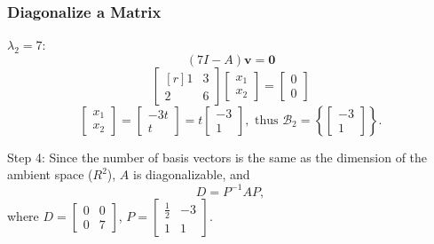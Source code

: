 \documentclass[10pt]{beamer}
\begin{document}
\begin{frame}
\frametitle{Diagonalize a Matrix}

$\lambda_2 = 7$:\pause
\[
 (7 I - A)\mathbf v = \mathbf 0
\]
\pause
\[
\begin{bmatrix*}[r]
1&3\\
2&6
\end{bmatrix*}\begin{bmatrix}
x_1\\
x_2
\end{bmatrix} = \begin{bmatrix}
0\\0	
\end{bmatrix}
\]\pause
\[
\begin{bmatrix}
x_1\\
x_2	
\end{bmatrix} = \begin{bmatrix}
-3t\\
t
\end{bmatrix} = t \begin{bmatrix}
-3\\
1
\end{bmatrix}, \text{ thus } \mathscr B_2 = \left\{ \begin{bmatrix}
-3\\
1
\end{bmatrix}\right\}.
\]\pause

Step 4: Since the number of basis vectors is the same as the dimension of the ambient space ($R^2$), $A$ is diagonalizable, and 
\[
D = P^{-1}AP, 
\] where $D = \begin{bmatrix}
0&0\\
0&7	
\end{bmatrix}$, $P = \begin{bmatrix}
\frac{1}{2}&-3\\
1&1
\end{bmatrix}$.
\end{frame}
\end{document}
